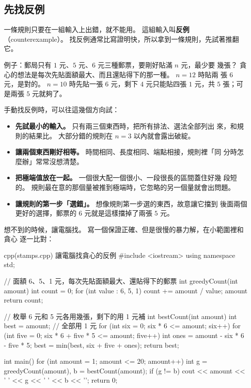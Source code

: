 \subsection{先找反例}
\label{sec:counterexample}

一條規則只要在一組輸入上出錯，就不能用。 這組輸入叫\textbf{反例}
（counterexample）。 找反例通常比寫證明快，所以拿到一條規則，先試著推翻它。

例子：郵局只有 $1$ 元、$5$ 元、$6$ 元三種郵票，要剛好貼滿 $n$ 元，最少要
幾張？ 貪心的想法是每次先貼面額最大、而且還貼得下的那一種。 $n = 12$ 時貼兩
張 $6$ 元，是對的。 $n = 10$ 時先貼一張 $6$ 元，剩下 $4$ 元只能貼四張 $1$
元，共 $5$ 張；可是兩張 $5$ 元就夠了。

手動找反例時，可以往這幾個方向試：

\begin{itemize}
\item \textbf{先試最小的輸入。} 只有兩三個東西時，把所有排法、選法全部列出
來，和規則的結果比。 大部分錯的規則在 $n = 3$ 以內就會露出破綻。
\item \textbf{讓兩個東西剛好相等。} 時間相同、長度相同、端點相接，規則裡「同
分時怎麼辦」常常沒想清楚。
\item \textbf{把極端值放在一起。} 一個很大配一個很小、一段很長的區間蓋住好幾
段短的。 規則最在意的那個量被推到極端時，它忽略的另一個量就會出問題。
\item \textbf{讓規則的第一步「選錯」。} 想像規則第一步選的東西，故意讓它擋到
後面兩個更好的選擇，郵票的 $6$ 元就是這樣擋掉了兩張 $5$ 元。
\end{itemize}

想不到的時候，讓電腦找。 寫一個保證正確、但是很慢的暴力解，在小範圍裡和貪心
逐一比對：

\begin{example}[label=ex:stamps]{cpp}{(stamps.cpp) 讓電腦找貪心的反例}
#include <iostream>
using namespace std;

// 面額 6、5、1 元，每次先貼面額最大、還貼得下的郵票
int greedyCount(int amount) {
    int count = 0;
    for (int value : {6, 5, 1}) {
        count += amount / value;
        amount %
    }
    return count;
}

// 枚舉 6 元和 5 元各用幾張，剩下的用 1 元補
int bestCount(int amount) {
    int best = amount;                    // 全部用 1 元
    for (int six = 0; six * 6 <= amount; six++) {
        for (int five = 0; six * 6 + five * 5 <= amount; five++) {
            int ones = amount - six * 6 - five * 5;
            best = min(best, six + five + ones);
        }
    }
    return best;
}

int main() {
    for (int amount = 1; amount <= 20; amount++) {
        int g = greedyCount(amount), b = bestCount(amount);
        if (g != b) {
            cout << amount << ' ' << g << ' ' << b << '\n';
        }
    }
    return 0;
}
\end{example}

